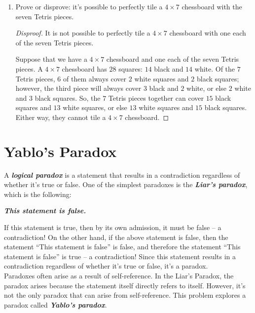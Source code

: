 \documentclass{article}
\renewcommand{\(}{\left(}
\renewcommand{\)}{\right)}
\renewcommand{\emph}[1]{\textit{\textbf{#1}}}
\theoremstyle{plain}
\theoremstyle{plain}
\theoremstyle{definition}
\begin{document}
\begin{enumerate}[resume*]

\item Prove or disprove: it's possible to perfectly tile a $4 \times 7$ chessboard with the seven Tetris pieces.

\begin{shaded}
\begin{proof}[Disproof]
	It is not possible to perfectly tile a $4 \times 7$ chessboard with one each of the seven Tetris pieces.
	
	Suppose that we have a $4 \times 7$ chessboard and one each of the seven Tetris pieces. A $4 \times 7$ chessboard has $28$ squares: $14$ black and $14$ white. Of the $7$ Tetris pieces, $6$ of them always cover $2$ white squares and $2$ black squares; however, the third piece will always cover $3$ black and $2$ white, or else $2$ white and $3$ black squares. So, the $7$ Tetris pieces together can cover $15$ black squares and $13$ white squares, or else $13$ white squares and $15$ black squares. Either way, they cannot tile a $4 \times 7$ chessboard.
	
\end{proof}
\end{shaded}

\end{enumerate}

\pagebreak

\section{Yablo's Paradox}

A \emph{logical paradox} is a statement that results in a contradiction
regardless of whether it's true or false.
One of the simplest paradoxes is the \emph{Liar's paradox},
which is the following:
\begin{center}
\emph{This statement is false.}
\end{center}
If this statement is true,
then by its own admission, it must be false -- a contradiction!
On the other hand, if the above statement is false, then the statement ``This statement is false'' is false, and therefore the
statement ``This statement is false'' is true -- a contradiction!
Since this statement results in a contradiction regardless of whether
it's true or false, it's a paradox. \\

Paradoxes often arise as a result of self-reference.
In the Liar's Paradox,
the paradox arises because the statement itself directly refers to itself.
However, it's not the only paradox that can arise from self-reference.
This problem explores a paradox called \emph{Yablo's paradox}. \\
\end{document}
